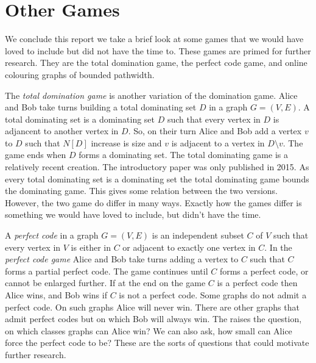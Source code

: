\section{Other Games}
We conclude this report we take a brief look at some games that we would have loved to include but did not have the time to. These games are primed for further research. They are the total domination game, the perfect code game, and online colouring graphs of bounded pathwidth.

The \textit{total domination game} is another variation of the domination game. Alice and Bob take turns building a total dominating set $D$ in a graph $G=(V,E)$. A total dominating set is a dominating set $D$ such that every vertex in $D$ is adjancent to another vertex in $D$. So, on their turn Alice and Bob add a vertex $v$ to $D$ such that $N[D]$ increase is size and $v$ is adjacent to a vertex in $D\setminus v$. The game ends when $D$ forms a dominating set. The total dominating game is a relatively recent creation. The introductory paper \cite{henning2015total} was only published in 2015. As every total dominating set is a dominating set the total dominating game bounds the dominating game. This gives some relation between the two versions. However, the two game do differ in many ways. Exactly how the games differ is something we would have loved to include, but didn't have the time.

A \textit{perfect code} in a graph $G=(V,E)$ is an independent subset $C$ of $V$ such that every vertex in $V$ is either in $C$ or adjacent to exactly one vertex in $C$. In the \textit{perfect code game} Alice and Bob take turns adding a vertex to $C$ such that $C$ forms a partial perfect code. The game continues until $C$ forms a perfect code, or cannot be enlarged further. If at the end on the game $C$ is a perfect code then Alice wins, and Bob wins if $C$ is not a perfect code. Some graphs do not admit a perfect code. On such graphs Alice will never win. There are other graphs that admit perfect codes but on which Bob will always win. The raises the question, on which classes graphs can Alice win? We can also ask, how small can Alice force the perfect code to be? These are the sorts of questions that could motivate further research. 

